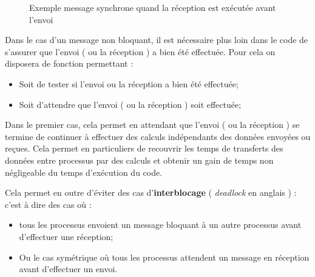 \documentclass[fleqn,11pt]{article}
\begin{document}
  \begin{figure}
    \centering
  \caption{Exemple message synchrone quand la réception est exécutée avant l'envoi}
  \end{figure}

Dans le cas d'un message non bloquant, il est nécessaire plus loin dans le code
de s'assurer que l'envoi ( ou la réception ) a bien été effectuée. Pour cela
on disposera de fonction permettant :

\begin{itemize}
\item Soit de tester si l'envoi ou la réception a bien été effectuée;
\item Soit d'attendre que l'envoi ( ou la réception ) soit effectuée;
\end{itemize}

Dans le premier cas, cela permet en attendant que l'envoi ( ou
la réception ) se termine de continuer à effectuer des calculs
indépendants des données envoyées ou reçues. Cela permet en particuliers
de recouvrir les temps de transferts des données entre processus par
des calculs et obtenir un gain de temps non négligeable du temps d'exécution
du code.

Cela permet en outre d'éviter des cas d'\textbf{interblocage} ( \textsl{deadlock} en
anglais ) : c'est à dire des cas
où :
\begin{itemize}
\item tous les processus envoient un message bloquant à un autre processus
avant d'effectuer une réception;
\item Ou le cas symétrique où tous les processus attendent un message en réception
avant d'effectuer un envoi.
\end{itemize}
\pagebreak
\end{document}
